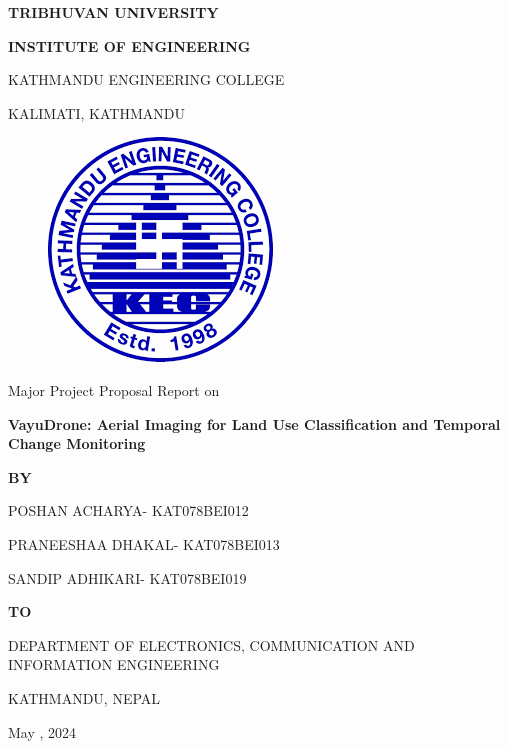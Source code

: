 \begin{titlepage}
    \thispagestyle{empty}
    \begin{center}
    
    \vspace*{\fill} %
    \vspace*{-1cm}
    {\Large \textbf{TRIBHUVAN UNIVERSITY
}\par}
{\large \textbf{INSTITUTE OF ENGINEERING
}\par}
\vspace{12pt}
KATHMANDU ENGINEERING COLLEGE

KALIMATI, KATHMANDU
\vspace{24pt}

\begin{figure}[ht]
    \centering
    \includegraphics[scale=0.45]{images/kec.png}
\end{figure}
\vspace{24pt}
{Major Project Proposal Report on\par}
\vspace{6pt}
{\textbf{VayuDrone: Aerial Imaging for Land Use Classification and Temporal Change Monitoring}\par}

\vspace{18pt}
{\textbf{BY}\par}
\vspace{10pt}
    
{POSHAN ACHARYA- KAT078BEI012\par}
{PRANEESHAA DHAKAL- KAT078BEI013\par}
{SANDIP ADHIKARI- KAT078BEI019\par}

\vspace{28pt}
{\textbf{TO}\par}
\vspace{10pt}
{DEPARTMENT OF ELECTRONICS, COMMUNICATION AND INFORMATION ENGINEERING\par}
{KATHMANDU, NEPAL\par}
\vspace{14pt}
{May , 2024\par}

    \vspace*{\fill}

    \end{center}
\end{titlepage}